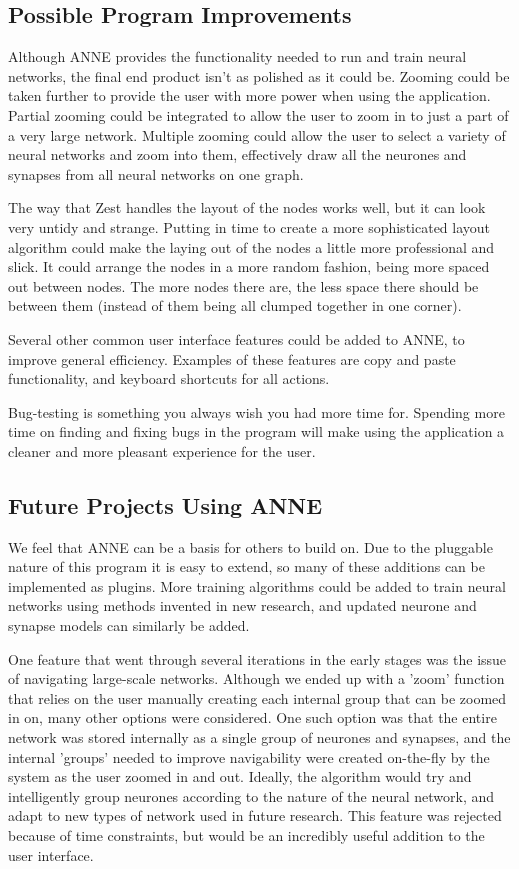 \documentclass{acm_proc_article-sp}
\begin{document}
\subsection{Possible Program Improvements}
{
Although ANNE provides the functionality needed to run and train neural networks, the final end product isn't as polished as it could be. Zooming could be taken further to provide the user with more power when using the application. Partial zooming could be integrated to allow the user to zoom in to just a part of a very large network. Multiple zooming could allow the user to select a variety of neural networks and zoom into them, effectively draw all the neurones and synapses from all neural networks on one graph.

The way that Zest handles the layout of the nodes works well, but it can look very untidy and strange. Putting in time to create a more sophisticated layout algorithm could make the laying out of the nodes a little more professional and slick. It could arrange the nodes in a more random fashion, being more spaced out between nodes. The more nodes there are, the less space there should be between them (instead of them being all clumped together in one corner).

Several other common user interface features could be added to ANNE, to improve general efficiency. Examples of these features are copy and paste functionality, and keyboard shortcuts for all actions.

Bug-testing is something you always wish you had more time for. Spending more time on finding and fixing bugs in the program will make using the application a cleaner and more pleasant experience for the user.
}
\subsection{Future Projects Using ANNE}
{
We feel that ANNE can be a basis for others to build on. Due to the pluggable nature of this program it is easy to extend, so many of these additions can be implemented as plugins. More training algorithms could be added to train neural networks using methods invented in new research, and updated neurone and synapse models can similarly be added.

One feature that went through several iterations in the early stages was the issue of navigating large-scale networks. Although we ended up with a 'zoom' function that relies on the user manually creating each internal group that can be zoomed in on, many other options were considered. One such option was that the entire network was stored internally as a single group of neurones and synapses, and the internal 'groups' needed to improve navigability were created on-the-fly by the system as the user zoomed in and out. Ideally, the algorithm would try and intelligently group neurones according to the nature of the neural network, and adapt to new types of network used in future research. This feature was rejected because of time constraints, but would be an incredibly useful addition to the user interface.
}
\end{document}
